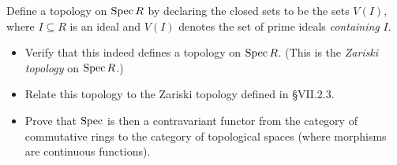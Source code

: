 \documentclass[../../master.tex]{subfiles}
\begin{document}
\begin{problem}
    Define a topology on $\operatorname{Spec} R$ by declaring the closed sets to be the sets $V(I)$, where $I \subseteq R$ is an ideal and $V(I)$ denotes the set of prime ideals \textit{containing} $I$.
    \begin{itemize}
        \item Verify that this indeed defines a topology on $\operatorname{Spec} R$.
            (This is the \textit{Zariski topology} on $\operatorname{Spec} R$.)
        \item Relate this topology to the Zariski topology defined in \S VII.2.3.
        \item Prove that $\operatorname{Spec}$ is then a contravariant functor from the category of commutative rings to the category of topological spaces (where morphisms are continuous functions).
    \end{itemize}
\end{problem}
\end{document}
